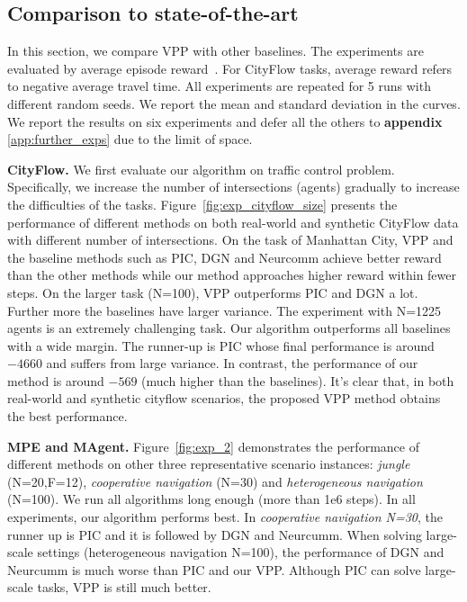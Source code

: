 \documentclass[11pt,a4paper]{article}
\theoremstyle{definition}
\begin{document}

\vspace{-2mm}
\subsection{Comparison to state-of-the-art}

In this section, we compare VPP with other baselines.  The experiments are evaluated by average episode reward~\citep{lowe2017multi}.
For CityFlow tasks, average reward refers to negative average travel time.
All experiments are repeated for 5 runs with different random seeds. We report the mean and standard deviation in the curves. We report the results on six experiments and defer all the others to \textbf{appendix} \ref{app:further_exps} due to the limit of space.  

\textbf{CityFlow.}
We first evaluate our algorithm on traffic control problem. Specifically, we increase the number of  intersections (agents) gradually to increase the difficulties of the tasks. Figure~\ref{fig:exp_cityflow_size} presents the performance of different methods on both real-world and synthetic CityFlow data with different number of intersections. On the task of Manhattan City,  VPP and the baseline methods such as PIC, DGN and Neurcomm achieve better reward than the other methods while our method approaches higher reward within fewer steps.
On the larger task (N=100), VPP outperforms PIC and DGN a lot. Further more the baselines have larger variance.
The experiment with N=1225 agents is an extremely challenging task. Our algorithm outperforms all baselines with a wide margin. The runner-up is PIC whose final performance is around  $-4660$ and suffers from large variance. In contrast, the performance of our method is around $-569$ (much higher than the baselines). It's clear that, in both real-world and synthetic cityflow scenarios, the proposed VPP method obtains the best performance. 


\textbf{MPE and MAgent.}
Figure~\ref{fig:exp_2} demonstrates the performance of different methods on other three representative scenario instances:   \textit{jungle} (N=20,F=12), \textit{cooperative navigation} (N=30) and \textit{heterogeneous navigation} (N=100). We run all algorithms long enough (more than 1e6 steps). In all experiments, our algorithm performs best.
In \textit{cooperative navigation N=30}, the runner up is PIC and it is followed by DGN and Neurcumm. When solving large-scale settings (heterogeneous navigation N=100), the performance of DGN and Neurcumm is much worse than PIC and our VPP.
Although PIC can solve large-scale tasks, VPP is still much better. 
\end{document}
